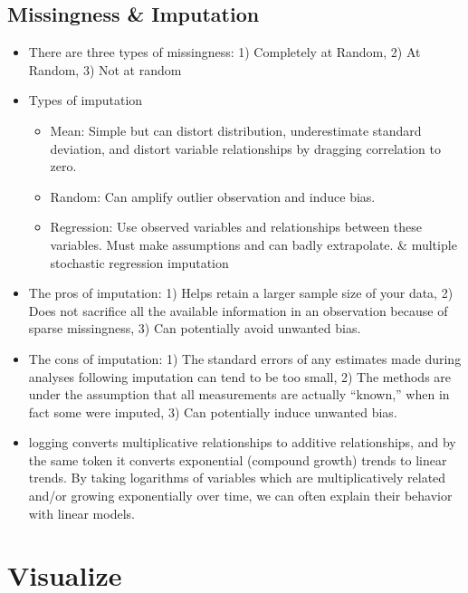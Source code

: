 \documentclass[]{book}
\providecommand{\tightlist}{%
  \setlength{\itemsep}{0pt}\setlength{\parskip}{0pt}}
\begin{document}
\hypertarget{missingness-imputation}{%
\subsection{Missingness \& Imputation}\label{missingness-imputation}}

\begin{itemize}
\item
  There are three types of missingness: 1) Completely at Random, 2) At Random, 3) Not at random
\item
  Types of imputation

  \begin{itemize}
  \tightlist
  \item
    Mean: Simple but can distort distribution, underestimate standard deviation, and distort variable relationships by dragging correlation to zero.
  \item
    Random: Can amplify outlier observation and induce bias.
  \item
    Regression: Use observed variables and relationships between these variables. Must make assumptions and can badly extrapolate.
    \& multiple stochastic regression imputation
  \end{itemize}
\item
  The pros of imputation: 1) Helps retain a larger sample size of your data, 2) Does not sacrifice all the available information in an observation because of sparse missingness, 3) Can potentially avoid unwanted bias.
\item
  The cons of imputation: 1) The standard errors of any estimates made during analyses following imputation can tend to be too small, 2) The methods are under the assumption that all measurements are actually ``known,'' when in fact some were imputed, 3) Can potentially induce unwanted bias.
\item
  logging converts multiplicative relationships to additive relationships, and by the same token it converts exponential (compound growth) trends to linear trends. By taking logarithms of variables which are multiplicatively related and/or growing exponentially over time, we can often explain their behavior with linear models.
\end{itemize}

\hypertarget{visualize}{%
\section{Visualize}\label{visualize}}
\end{document}
